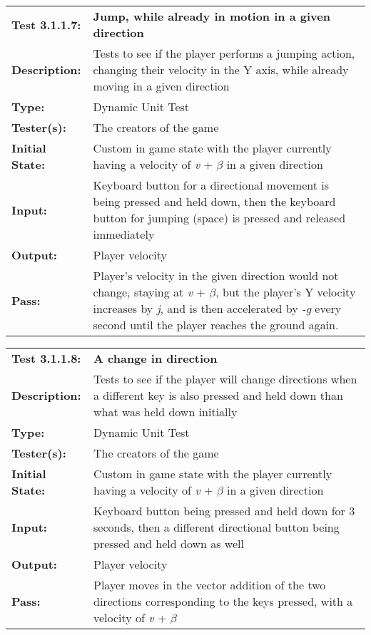 \documentclass[12pt, titlepage]{article}
\begin{document}
\begin{mdframed}[linewidth=1pt]
\begin{tabularx}{\textwidth}{@{}p{3cm}X@{}}
{\bf Test 3.1.1.7:} & {\bf Jump, while already in motion in a given direction}\\[\baselineskip]
{\bf Description:} & Tests to see if the player performs a jumping action, changing their velocity in the Y axis, while already moving in a given direction\\[0.5\baselineskip]
{\bf Type:} & Dynamic Unit Test\\[0.5\baselineskip]
{\bf Tester(s):} & The creators of the game\\[0.5\baselineskip]
{\bf Initial State:} & Custom in game state with the player currently having a velocity of \textit{v} + $\beta$ in a given direction \\[0.5\baselineskip]
{\bf Input:} & Keyboard button for a directional movement is being pressed and held down, then the keyboard button for jumping (space) is pressed and released immediately\\[0.5\baselineskip]
{\bf Output:} & Player velocity\\[0.5\baselineskip]
{\bf Pass:} & Player's velocity in the given direction would not change, staying at \textit{v} + $\beta$, but the player's Y velocity increases by \textit{j}, and is then accelerated by \textit{-g} every second until the player reaches the ground again. 
\end{tabularx}
\end{mdframed}

\begin{mdframed}[linewidth=1pt]
\begin{tabularx}{\textwidth}{@{}p{3cm}X@{}}
{\bf Test 3.1.1.8:} & {\bf A change in direction}\\[\baselineskip]
{\bf Description:} & Tests to see if the player will change directions when a different key is also pressed and held down than what was held down initially\\[0.5\baselineskip]
{\bf Type:} & Dynamic Unit Test\\[0.5\baselineskip]
{\bf Tester(s):} & The creators of the game\\[0.5\baselineskip]
{\bf Initial State:} & Custom in game state with the player currently having a velocity of \textit{v} + $\beta$ in a given direction\\[0.5\baselineskip]
{\bf Input:} & Keyboard button being pressed and held down for 3 seconds, then a different directional button being pressed and held down as well \\[0.5\baselineskip]
{\bf Output:} & Player velocity\\[0.5\baselineskip]
{\bf Pass:} & Player moves in the vector addition of the two directions corresponding to the keys pressed, with a velocity of \textit{v} + $\beta$
\end{tabularx}
\end{mdframed}
\end{document}

